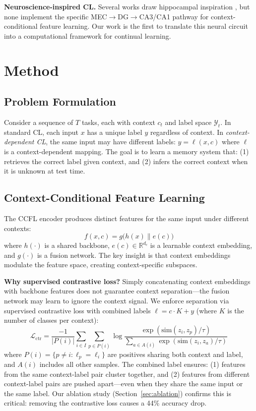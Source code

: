 \documentclass[letterpaper, 10pt, times]{article}
\begin{document}
\textbf{Neuroscience-inspired CL.} Several works draw hippocampal inspiration \cite{french1999using,kemker2018measuring}, but none implement the specific MEC$\to$DG$\to$CA3/CA1 pathway for context-conditional feature learning. Our work is the first to translate this neural circuit into a computational framework for continual learning.

\section{Method}

\subsection{Problem Formulation}

Consider a sequence of $T$ tasks, each with context $c_t$ and label space $\mathcal{Y}_t$. In standard CL, each input $x$ has a unique label $y$ regardless of context. In \emph{context-dependent CL}, the same input may have different labels: $y = \ell(x, c)$ where $\ell$ is a context-dependent mapping. The goal is to learn a memory system that: (1) retrieves the correct label given context, and (2) infers the correct context when it is unknown at test time.

\subsection{Context-Conditional Feature Learning}

The CCFL encoder produces distinct features for the same input under different contexts:
\begin{equation}
f(x, c) = g\big(h(x) \| e(c)\big)
\end{equation}
where $h(\cdot)$ is a shared backbone, $e(c) \in \mathbb{R}^{d_c}$ is a learnable context embedding, and $g(\cdot)$ is a fusion network. The key insight is that context embeddings modulate the feature space, creating context-specific subspaces.

\textbf{Why supervised contrastive loss?} Simply concatenating context embeddings with backbone features does not guarantee context separation---the fusion network may learn to ignore the context signal. We enforce separation via supervised contrastive loss with combined labels $\ell = c \cdot K + y$ (where $K$ is the number of classes per context):
\begin{equation}
\mathcal{L}_{\text{ctr}} = \frac{-1}{|P(i)|} \sum_{i \in I} \sum_{p \in P(i)} \log \frac{\exp(\text{sim}(z_i, z_p)/\tau)}{\sum_{a \in A(i)} \exp(\text{sim}(z_i, z_a)/\tau)}
\label{eq:ctr}
\end{equation}
where $P(i) = \{p \neq i : \ell_p = \ell_i\}$ are positives sharing both context and label, and $A(i)$ includes all other samples. The combined label ensures: (1) features from the same context-label pair cluster together, and (2) features from different context-label pairs are pushed apart---even when they share the same input or the same label. Our ablation study (Section~\ref{sec:ablation}) confirms this is critical: removing the contrastive loss causes a 44\% accuracy drop.
\end{document}
